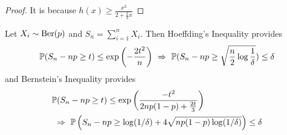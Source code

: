 \begin{enumerate}[label=\arabic{*}.]
\begin{cor}
	\end{cor}
	\begin{proof}
	    It is because $h(x) \geq \frac{x^2}{2+\frac{2}{3}x}$
	\end{proof}
	\begin{exam}
	    Let $X_i \sim \operatorname{Ber}(p)$ and $S_n = \sum_{i=1}^nX_i$. Then Hoeffding's Inequality provides
	    \begin{equation*}
	    	\mathbb{P}(S_n - np \geq t) \leq \exp\left(-\frac{2t^2}{n}\right)~\Rightarrow~\mathbb{P}(S_n - np \geq \sqrt{\frac{n}{2}\log \frac{1}{\delta}}) \leq \delta
	    \end{equation*}
	    and Bernstein's Inequality provides
	    \begin{equation*}
		    \begin{aligned}
		    	&\mathbb{P}(S_n - np \geq t) \leq \exp\left(\frac{-t^2}{2np(1-p)+\frac{2t}{3}}\right)\\
		    	&~\Rightarrow~\mathbb{P}\left(S_n-np \geq \log(1/\delta) + 4\sqrt{np(1-p)\log(1/\delta)}\right) \leq \delta
		    \end{aligned}
	    \end{equation*}
	\end{exam}
\end{enumerate}

